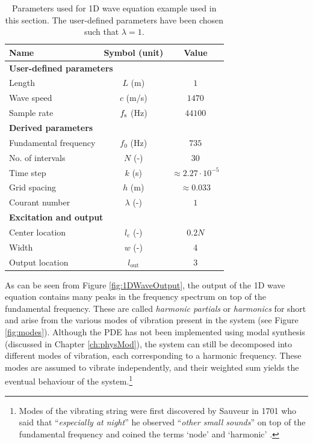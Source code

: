 \begin{table}[h]
    \begin{center}
    \begin{tabular}{|l|c|c|}
        \hline
        Name & Symbol (unit) & Value\\ \hline
        \multicolumn{3}{|l|}{\bf User-defined parameters}\\ \hline
        Length & $L$ (m) & $1$\\
        Wave speed & $c$ (m/s) & $1470$\\
        Sample rate & $f_\text{s}$ (Hz) & $44100$ \\\hline
        \multicolumn{3}{|l|}{\bf Derived parameters}\\ \hline
        Fundamental frequency & $f_0$ (Hz) & $735$\\
        No. of intervals & $N$ (-) & $30$ \\
        Time step & $k$ (s)& $\approx 2.27\cdot 10^{-5}$ \\
        Grid spacing & $h$ (m)& $\approx 0.033$ \\
        Courant number & $\lambda$ (-)& $1$ \\\hline
        \multicolumn{3}{|l|}{\bf Excitation and output}\\ \hline
        Center location& $l_\text{c}$ (-)& $0.2N$\\
        Width& $w$ (-)& 4\\
        Output location & $l_\text{out}$ & 3 \\\hline
    \end{tabular}
    \caption{Parameters used for 1D wave equation example used in this section. The user-defined parameters have been chosen such that $\lambda = 1$. \label{tab:1DWaveParams}}
    \end{center}
\end{table}

As can be seen from Figure \ref{fig:1DWaveOutput}, the output of the 1D wave equation contains many peaks in the frequency spectrum on top of the fundamental frequency. These are called \textit{harmonic partials} or \textit{harmonics} for short and arise from the various modes of vibration present in the system (see Figure \ref{fig:modes}). Although the PDE has not been implemented using modal synthesis (discussed in Chapter \ref{ch:physMod}), the system can still be decomposed into different modes of vibration, each corresponding to a harmonic frequency. These modes are assumed to vibrate independently, and their weighted sum yields the eventual behaviour of the system.\footnote{Modes of the vibrating string were first discovered by Sauveur in 1701 who said that  ``\textit{especially at night}'' he observed ``\textit{other small sounds}'' on top of the fundamental frequency and coined the terms `node' and `harmonic' \cite{Sauveur1701}.}

